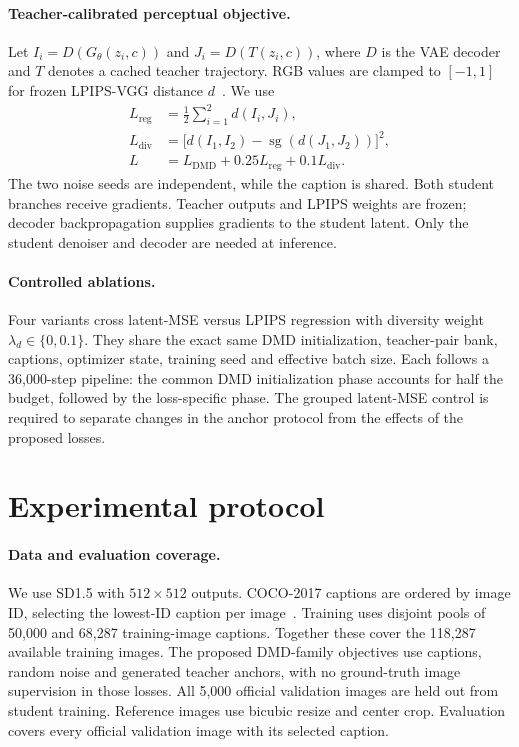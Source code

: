 \documentclass[10pt,twocolumn,letterpaper]{article}
\begin{document}
\paragraph{Teacher-calibrated perceptual objective.}
Let $I_i=D(G_\theta(z_i,c))$ and $J_i=D(T(z_i,c))$, where $D$ is the VAE
decoder and $T$ denotes a cached teacher trajectory. RGB values are clamped
to $[-1,1]$ for frozen LPIPS-VGG distance $d$~\cite{zhang2018lpips}. We use
\begin{align}
 L_{\mathrm{reg}}&=\tfrac12\sum_{i=1}^{2}d(I_i,J_i),\\
 L_{\mathrm{div}}&=\big[d(I_1,I_2)-\operatorname{sg}(d(J_1,J_2))\big]^2,\\
 L&=L_{\mathrm{DMD}}+0.25L_{\mathrm{reg}}+0.1L_{\mathrm{div}}.
\end{align}
The two noise seeds are independent, while the caption is shared. Both
student branches receive gradients. Teacher outputs and LPIPS weights
are frozen; decoder backpropagation supplies gradients to the student latent.
Only the student denoiser and decoder are needed at inference.

\paragraph{Controlled ablations.}
Four variants cross latent-MSE versus LPIPS regression with diversity weight
$\lambda_d\in\{0,0.1\}$. They share the exact same DMD initialization,
teacher-pair bank, captions, optimizer state, training seed and effective
batch size. Each follows a 36,000-step pipeline: the common DMD initialization
phase accounts for half the budget, followed by the loss-specific phase.
The grouped latent-MSE control is required to separate changes in the
anchor protocol from the effects of the proposed losses.

\section{Experimental protocol}
\paragraph{Data and evaluation coverage.}
We use SD1.5 with $512\times512$ outputs. COCO-2017 captions are ordered
by image ID, selecting the lowest-ID caption per image~\cite{chen2015coco}.
Training uses disjoint pools of 50,000 and 68,287 training-image captions.
Together these cover the 118,287 available training images. The proposed
DMD-family objectives use captions, random noise and generated teacher
anchors, with no ground-truth image supervision in those losses.
All 5,000 official validation images are held out from student training.
Reference images use bicubic resize and center crop. Evaluation covers every
official validation image with its selected caption.
\end{document}
